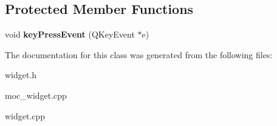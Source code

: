 \subsection*{Protected Member Functions}
\begin{DoxyCompactItemize}
\item 
\hypertarget{classWidget_a96b48889b8c1b29ecb2804008fbc89be}{void {\bfseries key\-Press\-Event} (Q\-Key\-Event $\ast$e)}\label{classWidget_a96b48889b8c1b29ecb2804008fbc89be}

\end{DoxyCompactItemize}


The documentation for this class was generated from the following files\-:\begin{DoxyCompactItemize}
\item 
widget.\-h\item 
moc\-\_\-widget.\-cpp\item 
widget.\-cpp\end{DoxyCompactItemize}
